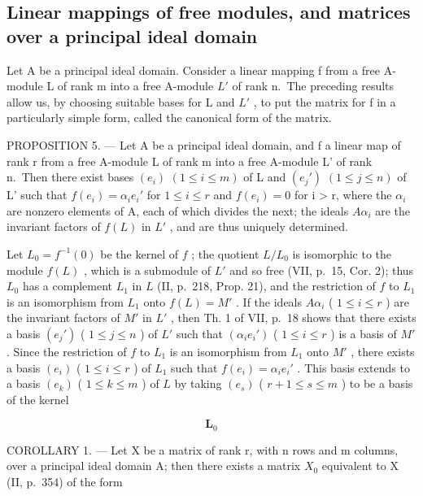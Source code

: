 \subsection{Linear mappings of free modules, and matrices over a principal ideal domain}

Let A be a principal ideal domain. Consider a linear mapping f from a free A-module L of rank m into a free A-module \(L'\) of rank n.~The preceding results allow us, by choosing suitable bases for L and \(L'\) , to put the matrix for f in a particularly simple form, called the canonical form of the matrix.

PROPOSITION 5. --- Let A be a principal ideal domain, and f a linear map of rank r from a free A-module L of rank m into a free A-module L' of rank n.~Then there exist bases \((e_{i})\) \((1 \leqslant i \leqslant m)\) of L and \((e_{j}')\) \((1 \leqslant j \leqslant n)\) of L' such that \(f(e_{i}) = \alpha_{i} e_{i}'\) for \(1 \leqslant i \leqslant r\) and \(f(e_{i}) = 0\) for i \textgreater{} r, where the \(\alpha_{i}\) are nonzero elements of A, each of which divides the next; the ideals \(A\alpha_{i}\) are the invariant factors of \(f(L)\) in \(L'\) , and are thus uniquely determined.

Let \(L_0 = f^{-1}(0)\) be the kernel of \(f\) ; the quotient \(L/L_0\) is isomorphic to the module \(f(L)\) , which is a submodule of \(L'\) and so free (VII, p.~15, Cor. 2); thus \(L_0\) has a complement \(L_1\) in \(L\) (II, p.~218, Prop. 21), and the restriction of \(f\) to \(L_1\) is an isomorphism from \(L_1\) onto \(f(L) = M'\) . If the ideals \(A\alpha_i\) ( \(1 \leqslant i \leqslant r\) ) are the invariant factors of \(M'\) in \(L'\) , then Th. 1 of VII, p.~18 shows that there exists a basis \((e_j')\) ( \(1 \leqslant j \leqslant n\) ) of \(L'\) such that \((\alpha_i e_i')\) ( \(1 \leqslant i \leqslant r\) ) is a basis of \(M'\) . Since the restriction of \(f\) to \(L_1\) is an isomorphism from \(L_1\) onto \(M'\) , there exists a basis \((e_i)\) ( \(1 \leqslant i \leqslant r\) ) of \(L_1\) such that \(f(e_i) = \alpha_i e_i'\) . This basis extends to a basis \((e_k)\) ( \(1 \leqslant k \leqslant m\) ) of \(L\) by taking \((e_s)\) ( \(r + 1 \leqslant s \leqslant m\) ) to be a basis of the kernel

\[
\mathbf {L} _ {0}
\]

COROLLARY 1. --- Let X be a matrix of rank r, with n rows and m columns, over a principal ideal domain A; then there exists a matrix \(X_{0}\) equivalent to X (II, p.~354) of the form

